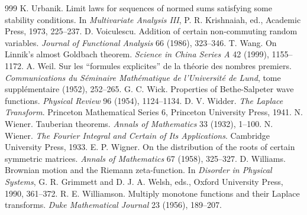 \begin{thebibliography}{999}
 K. Urbanik. Limit laws for sequences of normed sums satisfying some stability conditions. In \emph{Multivariate Analysis III}, P. R. Krishnaiah, ed., Academic Press, 1973, 225--237.
 D. Voiculescu. Addition of certain non-commuting random variables. \emph{Journal of Functional Analysis} 66 (1986), 323--346.
 T. Wang. On Linnik's almost Goldbach theorem. \emph{Science in China Series A} 42 (1999), 1155--1172.
 A. Weil. Sur les ``formules explicites'' de la th\'eorie des nombres premiers. \emph{Communications du S\'eminaire Math\'ematique de l'Universit\'e de Lund}, tome suppl\'ementaire (1952), 252--265.
 G. C. Wick. Properties of Bethe-Salpeter wave functions. \emph{Physical Review} 96 (1954), 1124--1134.
 D. V. Widder. \emph{The Laplace Transform}. Princeton Mathematical Series 6, Princeton University Press, 1941.
 N. Wiener. Tauberian theorems. \emph{Annals of Mathematics} 33 (1932), 1--100.
 N. Wiener. \emph{The Fourier Integral and Certain of Its Applications}. Cambridge University Press, 1933.
 E. P. Wigner. On the distribution of the roots of certain symmetric matrices. \emph{Annals of Mathematics} 67 (1958), 325--327.
 D. Williams. Brownian motion and the Riemann zeta-function. In \emph{Disorder in Physical Systems}, G. R. Grimmett and D. J. A. Welsh, eds., Oxford University Press, 1990, 361--372.
 R. E. Williamson. Multiply monotone functions and their Laplace transforms. \emph{Duke Mathematical Journal} 23 (1956), 189--207.

\end{thebibliography}

